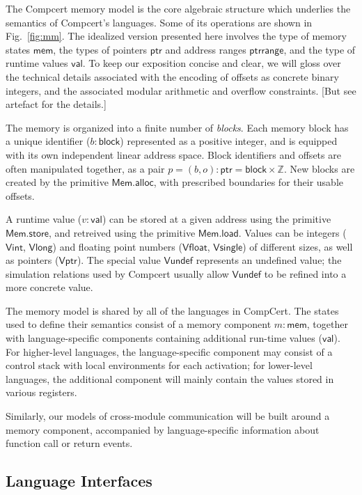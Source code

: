 \documentclass[acmsmall,timestamp,review]{acmart}
\newcommand{\kw}[1]{\ensuremath{ \mathsf{#1} }}
\begin{document}
The Compcert memory model \cite{compcertmmv2}
is the core algebraic structure
which underlies the semantics of Compcert's languages.
Some of its operations
are shown in Fig.~\ref{fig:mm}.
The idealized version presented here
involves
the type of memory states \kw{mem},
the types of pointers \kw{ptr} and address ranges \kw{ptrrange}, and
the type of runtime values \kw{val}.
To keep our exposition concise and clear,
we will gloss over the technical details
associated with the encoding of offsets
as concrete binary integers,
and the associated modular arithmetic and overflow constraints.
[But see artefact for the details.]

The memory is organized into a finite number of \emph{blocks}.
Each memory block has a unique identifier ($b : \kw{block}$)
represented as a positive integer,
and is equipped with its own independent linear address space.
Block identifiers and offsets are often manipulated together,
as a pair $p = (b, o) : \kw{ptr} = \kw{block} \times \mathbb{Z}$.
New blocks are created by the primitive $\kw{Mem.alloc}$,
with prescribed boundaries for their usable offsets.

A runtime value ($v : \kw{val}$) can be stored at
a given address using the primitive \kw{Mem.store},
and retreived using the primitive \kw{Mem.load}.
Values can be integers (\kw{Vint}, \kw{Vlong}) and
floating point numbers (\kw{Vfloat}, \kw{Vsingle})
of different sizes,
as well as pointers (\kw{Vptr}).
The special value \kw{Vundef}
represents an undefined value;
the simulation relations used by Compcert
usually allow $\kw{Vundef}$
to be refined into a more concrete value.

The memory model is shared by all of the languages in CompCert.
The states used to define their semantics consist of
a memory component $m : \kw{mem}$,
together with language-specific components
containing additional run-time values ($\kw{val}$).
For higher-level languages,
the language-specific component may consist of
a control stack with local environments for each activation;
for lower-level languages,
the additional component will mainly contain
the values stored in various registers.

Similarly,
our models of cross-module communication
will be built around a memory component,
accompanied by language-specific information
about function call or return events.


\subsection{Language Interfaces} \label{sec:compcert:li} %
\end{document}
